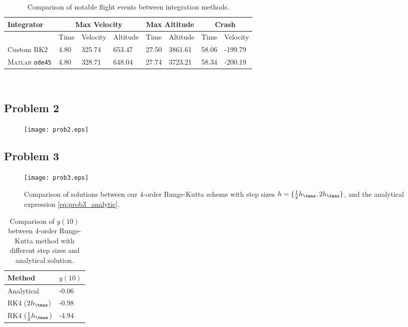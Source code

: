 \documentclass[12pt]{article}
\begin{document}
\begin{table}[t]
\centering
\begin{tabular}{llllllll}
\toprule
Integrator   & \multicolumn{3}{c}{Max Velocity} & \multicolumn{2}{c}{Max Altitude} & \multicolumn{2}{c}{Crash} \\
\midrule
~            & Time & Velocity & Altitude       & Time         & Altitude & Time  & Velocity \\
Custom RK2                        & 4.80 & 325.74   & 653.47  & 27.50  & 3861.61  & 58.06 & -199.79  \\
\textsc{Matlab} \lstinline|ode45| & 4.80 & 328.71   & 648.04  & 27.74  & 3723.21  & 58.34 & -200.19 \\
\bottomrule
\end{tabular}
\\[6pt]
\caption{Comparison of notable flight events between integration methods.}
\label{tbl:rocket}
\end{table}

\subsection{Problem 2}

\begin{figure}[t]
\begin{center}
\texttt{[image: prob2.eps]}
\\[6pt]
\caption{}
\label{fig:prob2}
\end{center}
\end{figure}

\subsection{Problem 3}

\begin{figure}[t]
\begin{center}
\texttt{[image: prob3.eps]}
\\[6pt]
\caption{Comparison of solutions between our 4\nd-order Runge-Kutta scheme with step sizes $h = \{ \tfrac{1}{2} h_\tmax, 2 h_\tmax \}$, and the analytical expression \eqref{eq:prob3_analytic}.}
\label{fig:prob3}
\end{center}
\end{figure}

\begin{table}[t]
\centering
\begin{tabular}{ll}
\toprule
Method & $y(10)$ \\
\midrule
Analytical                  & -0.06 \\
RK4 ($2h_\tmax$)            & -0.98 \\
RK4 ($\tfrac{1}{2}h_\tmax$) & -4.94 \\
\bottomrule
\end{tabular}
\\[6pt]
\caption{Comparison of $y(10)$ between 4\th-order Runge-Kutta method with different step sizes and analytical solution.}
\label{tbl:prob3}
\end{table}
\end{document}

